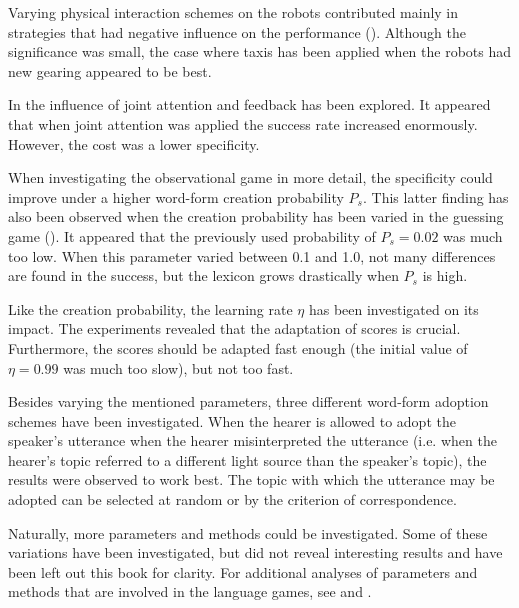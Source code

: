 Varying physical interaction schemes on the robots contributed mainly in strategies that had negative influence on the performance (). Although the significance was small, the case where taxis has been applied when the robots had new gearing appeared to be best.

In  the influence of joint attention and feedback has been explored. It appeared that when joint attention was applied the success rate increased enormously. However, the cost was a lower specificity.

When investigating the observational game in more detail, the specificity could improve under a higher word-form creation probability $P_s$. This latter finding has also been observed when the creation probability has been varied in the guessing game (). It appeared that the previously used probability of $P_s=0.02$ was much too low. When this parameter varied between 0.1 and 1.0, not many differences are found in the success, but the lexicon grows drastically when $P_s$ is high.

Like the creation probability, the learning rate $\eta$ has been investigated on its impact. The experiments revealed that the adaptation of scores is crucial. Furthermore, the scores should be adapted fast enough (the initial value of $\eta=0.99$ was much too slow), but not too fast.

Besides varying the mentioned parameters, three different word-form adoption schemes have been investigated. When the hearer is allowed to adopt the speaker's utterance when the hearer misinterpreted the utterance (i.e. when the hearer's topic referred to a different light source than the speaker's topic), the results were observed to work best. The topic with which the utterance may be adopted can be selected at random or by the criterion of correspondence. 


Naturally, more parameters and methods could be investigated. Some of these variations have been investigated, but did not reveal interesting results and have been left out this book for clarity. For additional analyses of parameters and methods that are involved in the language games, see \cite{dejong:2000} and \cite{kaplan:2000}.

